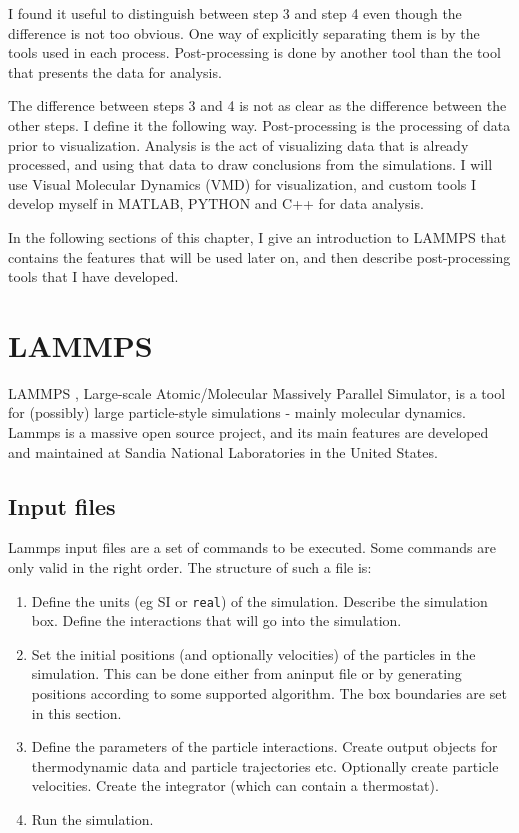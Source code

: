 I found it useful to distinguish between step 3 and step 4 even though the difference is not too obvious. One way of explicitly separating them is by the tools used in each process. Post-processing is done by another tool than the tool that presents the data for analysis. 

The difference between steps 3 and 4 is not as clear as the difference between the other steps. I define it the following way. Post-processing is the processing of data prior to visualization. Analysis is the act of visualizing data that is already processed, and using that data to draw conclusions from the simulations. I will use Visual Molecular Dynamics (VMD) \cite{HUMP96} for visualization, and custom tools I develop myself in MATLAB, PYTHON and C++ for data analysis.

In the following sections of this chapter, I give an introduction to LAMMPS that contains the features that will be used later on, and then describe post-processing tools that I have developed. 

\section{LAMMPS}
LAMMPS \cite{Plimpton1995}, Large-scale Atomic/Molecular Massively Parallel Simulator, is a tool for (possibly) large particle-style simulations - mainly molecular dynamics. Lammps is a massive open source project, and its main features are developed and maintained at Sandia National Laboratories in the United States. 

\subsection{Input files}
Lammps input files are a set of commands to be executed. Some commands are only valid in the right order. The structure of such a file is:

\begin{enumerate}
\item {} Define the units (eg SI or {\tt real}) of the simulation. Describe the simulation box. Define the interactions that will go into the simulation. 
\item {} Set the initial positions (and optionally velocities) of the particles in the simulation. This can be done either from aninput file or by generating positions according to some supported algorithm. The box boundaries are set in this section.
\item {} Define the parameters of the particle interactions. Create output objects for thermodynamic data and particle trajectories etc. Optionally create particle velocities. Create the integrator (which can contain a thermostat).
\item {} Run the simulation.
\end{enumerate}

